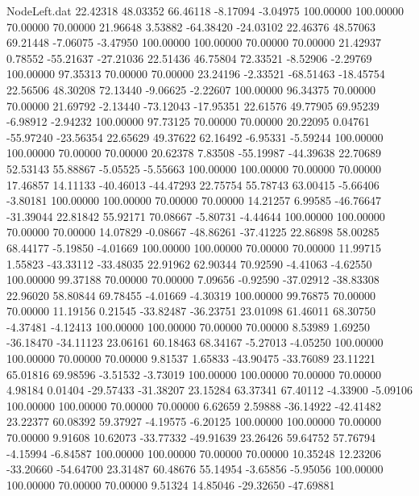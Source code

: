 \begin{filecontents}{NodeLeft.dat}
  22.42318   48.03352   66.46118    -8.17094   -3.04975  100.00000  100.00000   70.00000   70.00000   21.96648    3.53882  -64.38420  -24.03102
  22.46376   48.57063   69.21448    -7.06075   -3.47950  100.00000  100.00000   70.00000   70.00000   21.42937    0.78552  -55.21637  -27.21036
  22.51436   46.75804   72.33521    -8.52906   -2.29769  100.00000   97.35313   70.00000   70.00000   23.24196   -2.33521  -68.51463  -18.45754
  22.56506   48.30208   72.13440    -9.06625   -2.22607  100.00000   96.34375   70.00000   70.00000   21.69792   -2.13440  -73.12043  -17.95351
  22.61576   49.77905   69.95239    -6.98912   -2.94232  100.00000   97.73125   70.00000   70.00000   20.22095    0.04761  -55.97240  -23.56354
  22.65629   49.37622   62.16492    -6.95331   -5.59244  100.00000  100.00000   70.00000   70.00000   20.62378    7.83508  -55.19987  -44.39638
  22.70689   52.53143   55.88867    -5.05525   -5.55663  100.00000  100.00000   70.00000   70.00000   17.46857   14.11133  -40.46013  -44.47293
  22.75754   55.78743   63.00415    -5.66406   -3.80181  100.00000  100.00000   70.00000   70.00000   14.21257    6.99585  -46.76647  -31.39044
  22.81842   55.92171   70.08667    -5.80731   -4.44644  100.00000  100.00000   70.00000   70.00000   14.07829   -0.08667  -48.86261  -37.41225
  22.86898   58.00285   68.44177    -5.19850   -4.01669  100.00000  100.00000   70.00000   70.00000   11.99715    1.55823  -43.33112  -33.48035
  22.91962   62.90344   70.92590    -4.41063   -4.62550  100.00000   99.37188   70.00000   70.00000    7.09656   -0.92590  -37.02912  -38.83308
  22.96020   58.80844   69.78455    -4.01669   -4.30319  100.00000   99.76875   70.00000   70.00000   11.19156    0.21545  -33.82487  -36.23751
  23.01098   61.46011   68.30750    -4.37481   -4.12413  100.00000  100.00000   70.00000   70.00000    8.53989    1.69250  -36.18470  -34.11123
  23.06161   60.18463   68.34167    -5.27013   -4.05250  100.00000  100.00000   70.00000   70.00000    9.81537    1.65833  -43.90475  -33.76089
  23.11221   65.01816   69.98596    -3.51532   -3.73019  100.00000  100.00000   70.00000   70.00000    4.98184    0.01404  -29.57433  -31.38207
  23.15284   63.37341   67.40112    -4.33900   -5.09106  100.00000  100.00000   70.00000   70.00000    6.62659    2.59888  -36.14922  -42.41482
  23.22377   60.08392   59.37927    -4.19575   -6.20125  100.00000  100.00000   70.00000   70.00000    9.91608   10.62073  -33.77332  -49.91639
  23.26426   59.64752   57.76794    -4.15994   -6.84587  100.00000  100.00000   70.00000   70.00000   10.35248   12.23206  -33.20660  -54.64700
  23.31487   60.48676   55.14954    -3.65856   -5.95056  100.00000  100.00000   70.00000   70.00000    9.51324   14.85046  -29.32650  -47.69881

\end{filecontents}
